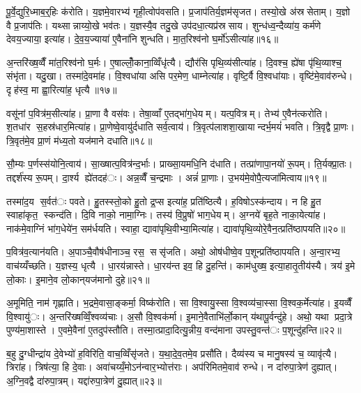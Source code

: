 पू॒र्वे॒द्युरि॒ध्माब॒र्॒हिः क॑रोति। य॒ज्ञमे॒वारभ्य॑ गृही॒त्वोप॑वसति। प्र॒जाप॑तिर्य॒ज्ञम॑सृजत। तस्यो॒खे अ॑स्रसेताम्। य॒ज्ञो वै प्र॒जाप॑तिः। यथ्सान्नाय्यो॒खे भव॑तः। य॒ज्ञस्यै॒व तदु॒खे उप॑दधा॒त्यप्र॑स्रसाय। शुन्ध॑ध्व॒न्दैव्या॑य॒ कर्म॑णे देवय॒ज्याया॒ इत्या॑ह। दे॒व॒य॒ज्याया॑ ए॒वैना॑नि शुन्धति। मा॒त॒रिश्व॑नो घ॒र्मो॑ऽसीत्या॑ह॥१६॥

अ॒न्तरि॑ख्ष॒व्वैँ मा॑त॒रिश्व॑नो घ॒र्मः। ए॒षाल्लोँ॒काना॒व्विँधृ॑त्यै। द्यौर॑सि पृथि॒व्य॑सीत्या॑ह। दि॒वश्च॒ ह्ये॑षा पृ॑थि॒व्याश्च॒ संभृ॑ता। यदु॒खा। तस्मा॑दे॒वमा॑ह। वि॒श्वधा॑या असि पर॒मेण॒ धाम्नेत्या॑ह। वृष्टि॒र्वै वि॒श्वधा॑याः। वृष्टि॑मे॒वाव॑रुन्धे। दृह॑स्व॒ मा ह्वा॒रित्या॑ह॒ धृत्यै॥१७॥

वसू॑नां प॒वित्र॑म॒सीत्या॑ह। प्रा॒णा वै वस॑वः। तेषा॒व्वाँ ए॒तद्भा॑ग॒धेयम्। यत्प॒वित्रम्। तेभ्य॑ ए॒वैन॑त्करोति। श॒तधा॑र स॒हस्र॑धार॒मित्या॑ह। प्रा॒णेष्वे॒वायु॑र्दधाति सर्व॒त्वाय॑। त्रि॒वृत्प॑लाशशा॒खायान्दर्भ॒मयं॑ भवति। त्रि॒वृद्वै प्रा॒णः। त्रि॒वृत॑मे॒व प्रा॒णं म॑ध्य॒तो यज॑माने दधाति॥१८॥

सौ॒म्यः प॒र्णस्स॑योनि॒त्वाय॑। सा॒ख्षात्प॒वित्र॑न्द॒र्भाः। प्राख्सा॒यमधि॒नि द॑धाति। तत्प्रा॑णापा॒नयो॑ रू॒पम्। ति॒र्यक्प्रा॒तः। तद्दर्श॑स्य रू॒पम्। दा॒र्श्य ह्ये॑तदह॑ः। अन्न॒व्वैँ च॒न्द्रमाः। अन्नं॑ प्रा॒णाः। उ॒भय॑मे॒वोपै॒त्यजा॑मित्वाय॥१९॥

तस्मा॑द॒य स॒र्वत॑ः पवते। हु॒तस्स्तो॒को हु॒तो द्र॒प्स इत्या॑ह॒ प्रति॑ष्ठित्यै। ह॒विषोऽस्क॑न्दाय। न हि हु॒त स्वाहा॑कृत॒ स्कन्द॑ति। दि॒वि नाको॒ नामा॒ग्निः। तस्य॑ वि॒प्रुषो॑ भाग॒धेयम्। अ॒ग्नये॑ बृह॒ते नाका॒येत्या॑ह। नाक॑मे॒वाग्निं भा॑ग॒धेये॑न॒ सम॑र्धयति। स्वाहा॒ द्यावा॑पृथि॒वीभ्या॒मित्या॑ह। द्यावा॑पृथि॒व्योरे॒वैन॒त्प्रति॑ष्ठापयति॥२०॥

प॒वित्र॑व॒त्यान॑यति। अ॒पाञ्चै॒वौष॑धीनाञ्च॒ रस॒ ससृ॑जति। अथो॒ ओष॑धीष्वे॒व प॒शून्प्रति॑ष्ठापयति। अ॒न्वा॒रभ्य॒ वाच॑य्यँच्छति। य॒ज्ञस्य॒ धृत्यै। धा॒रय॑न्नास्ते। धा॒रय॑न्त इव॒ हि दु॒हन्ति॑। काम॑धुख्ष॒ इत्या॒हातृ॒तीय॑स्यै। त्रय॑ इ॒मे लो॒काः। इ॒माने॒व लो॒कान्‌यज॑मानो दुहे॥२१॥

अ॒मूमिति॒ नाम॑ गृह्णाति। भ॒द्रमे॒वासा॒ङ्कर्मा॒ विष्क॑रोति। सा वि॒श्वायु॒स्सा वि॒श्वव्य॑चा॒स्सा वि॒श्वक॒र्मेत्या॑ह। इ॒यव्वैँ वि॒श्वायु॑ः। अ॒न्तरि॑ख्षव्विँ॒श्वव्य॑चाः। अ॒सौ वि॒श्वक॑र्मा। इ॒माने॒वैताभि॑र्लो॒कान्‌ य॑थापू॒र्वन्दु॑हे। अथो॒ यथा प्रदा॒त्रे पुण्य॑मा॒शास्ते। ए॒वमे॒वैना॑ ए॒तदुप॑स्तौति। तस्मा॒त्प्रादा॒दित्यु॒न्नीय॒ वन्द॑माना उपस्तु॒वन्त॑ः प॒शून्दु॑हन्ति॥२२॥

ब॒हु दु॒ग्धीन्द्रा॑य दे॒वेभ्यो॑ ह॒विरिति॒ वाच॒व्विँसृ॑जते। य॒था॒दे॒व॒तमे॒व प्रसौ॑ति। दैव्य॑स्य च मानु॒षस्य॑ च॒ व्यावृ॑त्यै। त्रिरा॑ह। त्रिष॑त्या॒ हि दे॒वाः। अवा॑चय्यँ॒मोऽन॑न्वार॒भ्योत्त॑राः। अप॑रिमितमे॒वाव॑ रुन्धे। न दा॑रुपा॒त्रेण॑ दुह्यात्। अ॒ग्नि॒वद्वै दा॑रुपा॒त्रम्। यद्दा॑रुपा॒त्रेण॑ दु॒ह्यात्॥२३॥

